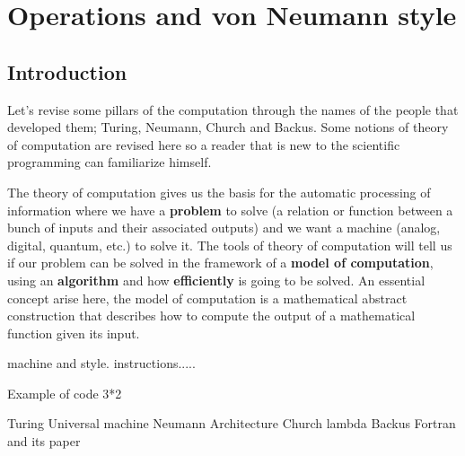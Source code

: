 \chapter{Operations and von Neumann style} 

\section{Introduction}

Let's revise some pillars of the computation through the names of the people that developed them; Turing, Neumann, Church and Backus. 
Some notions of theory of computation are revised here so a reader that is new to the scientific programming can familiarize himself. 

The theory of computation gives us the basis for the automatic processing of information where we have a \textbf{problem} to solve (a relation or function between a bunch of inputs and their associated outputs) and we want a machine (analog, digital, quantum, etc.) to solve it. 
The tools of theory of computation will tell us if our problem can be solved in the framework of a \textbf{model of computation}, using an \textbf{algorithm} and how \textbf{efficiently} is going to be solved. 
An essential concept arise here, the model of computation is a mathematical abstract construction that describes how to compute the output of a mathematical function given its input. 





machine and style. instructions.....

Example of code 3*2 

Turing Universal machine 
Neumann Architecture 
Church lambda 
Backus Fortran and its paper 
















\newpage 
